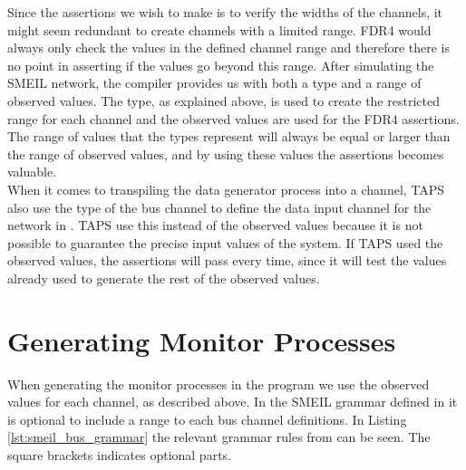 Since the assertions we wish to make is to verify the widths of the channels, it might seem redundant to create \cspm{} channels with a limited range. FDR4 would always only check the values in the defined channel range and therefore there is no point in asserting if the values go beyond this range. After simulating the SMEIL network, the compiler provides us with both a type and a range of observed values. The type, as explained above, is used to create the restricted range for each \cspm{} channel and the observed values are used for the FDR4 assertions. The range of values that the types represent will always be equal or larger than the range of observed values, and by using these values the assertions becomes valuable.\\

When it comes to transpiling the data generator process into a \cspm{} channel, TAPS also use the type of the bus channel to define the data input channel for the network in \cspm{}. TAPS use this instead of the observed values because it is not possible to guarantee the precise input values of the system. If TAPS used the observed values, the assertions will pass every time, since it will test the values already used to generate the rest of the observed values.

\section{Generating Monitor Processes}
When generating the monitor processes in the \cspm{} program we use the observed values for each channel, as described above.
In the SMEIL grammar defined in \cite{Asheim2018} it is optional to include a range to each bus channel definitions. In Listing \ref{lst:smeil_bus_grammar} the relevant grammar rules from \cite{Asheim2018} can be seen. The square brackets indicates optional parts.

